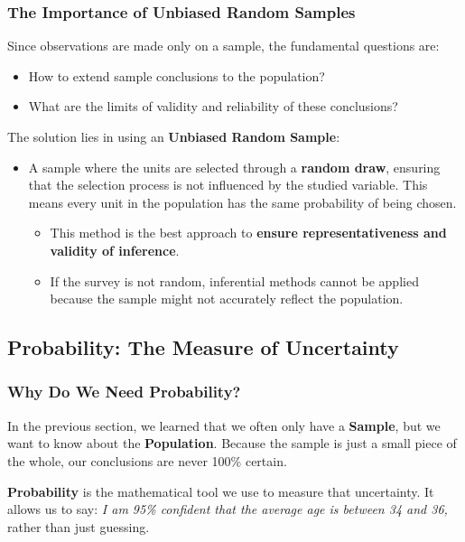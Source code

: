 \subsubsection{The Importance of Unbiased Random Samples}

Since observations are made only on a sample, the fundamental questions are:
\begin{itemize}[label=-]
 \item How to extend sample conclusions to the population?
 \item What are the limits of validity and reliability of these conclusions?
\end{itemize}

The solution lies in using an \textbf{Unbiased Random Sample}:

\begin{itemize}
\item  A sample where the units are selected through a \textbf{random draw}, ensuring that the selection process is not influenced by the studied variable. This means every unit in the population has the same probability of being chosen.
\begin{itemize}
    \item This method is the best approach to \textbf{ensure representativeness and validity of inference}.
    \item If the survey is not random, inferential methods cannot be applied because the sample might not accurately reflect the population.
\end{itemize}
\end{itemize}

\subsection{Probability: The Measure of Uncertainty}

\subsubsection{Why Do We Need Probability?}

In the previous section, we learned that we often only have a \textbf{Sample}, but we want to know about the \textbf{Population}.
Because the sample is just a small piece of the whole, our conclusions are never 100\% certain.

\textbf{Probability} is the mathematical tool we use to measure that uncertainty. It allows us to say: \textit{I am 95\% confident that the average age is between 34 and 36,} rather than just guessing.

